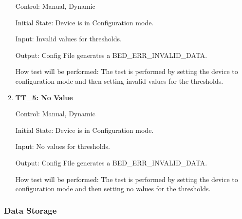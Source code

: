 \documentclass[12pt, titlepage]{article}
\begin{document}
\begin{enumerate}
		Control: Manual, Dynamic
							
		Initial State: Device is in Configuration mode.
							
		Input: Invalid values for thresholds.
		
		Output: Config File generates a BED\_ERR\_INVALID\_DATA.
		
		How test will be performed: The test is performed by setting the device to configuration mode and then setting invalid values for the thresholds.

	\item{\textbf{TT\_5: No Value} \\}\label{TT5}
	
		Control: Manual, Dynamic
							
		Initial State: Device is in Configuration mode.
							
		Input: No values for thresholds.
		
		Output: Config File generates a BED\_ERR\_INVALID\_DATA.

		How test will be performed: The test is performed by setting the device to configuration mode and then setting no values for the thresholds.
\end{enumerate}

\subsubsection{Data Storage}
\end{document}
